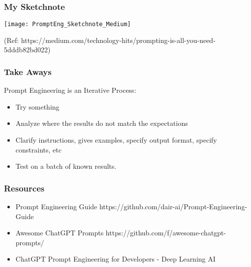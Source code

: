 \begin{frame}[fragile]\frametitle{My Sketchnote}

\begin{center}
\texttt{[image: PromptEng\_Sketchnote\_Medium]}

{\tiny (Ref: https://medium.com/technology-hits/prompting-is-all-you-need-5dddb82bd022)}
\end{center}		

\end{frame}


\begin{frame}[fragile]\frametitle{Take Aways}

Prompt Engineering is an Iterative Process:

\begin{itemize}
\item Try something
\item Analyze where the results do not match the expectations
\item Clarify instructions, gives examples, specify output format, specify constraints, etc
\item Test on a batch of known results.
\end{itemize}
\end{frame}


\begin{frame}[fragile]\frametitle{Resources}
\begin{itemize}
\item Prompt Engineering Guide https://github.com/dair-ai/Prompt-Engineering-Guide
\item Awesome ChatGPT Prompts https://github.com/f/awesome-chatgpt-prompts/
\item ChatGPT Prompt Engineering for Developers - Deep Learning AI
\end{itemize}	 
\end{frame}

